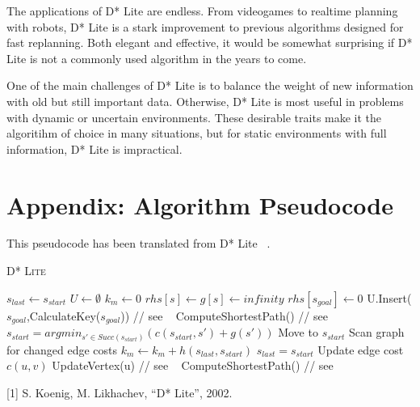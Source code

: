 \documentclass[11pt]{article}
\begin{document}
The applications of D* Lite are endless. From videogames to realtime planning with robots, D* Lite is a stark improvement to previous algorithms designed for fast replanning. Both elegant and effective, it would be somewhat surprising if D* Lite is not a commonly used algorithm in the years to come.

One of the main challenges of D* Lite is to balance the weight of new information with old but still important data. Otherwise, D* Lite is most useful in problems with dynamic or uncertain environments. These desirable traits make it the algoritihm of choice in many situations, but for static environments with full information, D* Lite is impractical.

\section*{Appendix: Algorithm Pseudocode}

This pseudocode has been translated from D* Lite ~\autocite{koenig}. 

\begin{algorithm}[H]\caption{\textsc{D* Lite }}
 \begin{algorithmic}[1]
  \State $s_{last} \leftarrow s_{start}$
  \State $U \leftarrow \emptyset$
  \State $k_m \leftarrow 0$
   \State $rhs[s] \leftarrow g[s] \leftarrow infinity$
  \EndFor
  \State $rhs[s_{goal}] \leftarrow 0$
  \State U.Insert($s_{goal}$,CalculateKey($s_{goal}$)) // see ~\autocite{koenig}
  \State ComputeShortestPath() //  see ~\autocite{koenig}
   \State $s_{start}=argmin_{s'\in Succ(s_{start})}(c(s_{start},s')+g(s'))$
   \State Move to $s_{start}$
   \State Scan graph for changed edge costs
    \State $k_m \leftarrow k_m+h(s_{last},s_{start})$
    \State $s_{last}=s_{start}$
     \State Update edge cost $c(u,v)$
     \State UpdateVertex(u) //  see ~\autocite{koenig}
    \EndFor
    \State ComputeShortestPath() // see ~\autocite{koenig}
   \EndIf
  \EndWhile
 \end{algorithmic}
\end{algorithm}

[1] S. Koenig, M. Likhachev, “D* Lite”, 2002.
\end{document}
